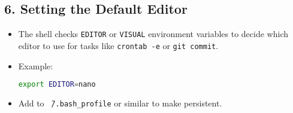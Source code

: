 \documentclass[a4paper]{report}
\begin{document}
\subsection*{6. Setting the Default Editor}
\begin{itemize}
    \item The shell checks \texttt{EDITOR} or \texttt{VISUAL} environment variables to decide which editor to use for tasks like \texttt{crontab -e} or \texttt{git commit}.
    \item Example:
\begin{lstlisting}[language=bash]
export EDITOR=nano
\end{lstlisting}
    \item Add to \texttt{\~\ /.bash\_profile} or similar to make persistent.
\end{itemize}
\end{document}
